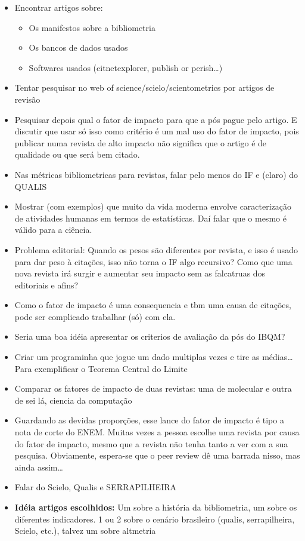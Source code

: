 \documentclass[11pt]{article}
\begin{document}
\begin{itemize}
\item Encontrar artigos sobre:
\begin{itemize}
\item Os manifestos sobre a bibliometria
\item Os bancos de dados usados
\item Softwares usados (citnetexplorer, publish or perish\ldots{})
\end{itemize}
\item Tentar pesquisar no web of science/scielo/scientometrics por artigos de revisão
\item Pesquisar depois qual o fator de impacto para que a pós pague pelo artigo. E discutir que usar só isso como critério é um mal uso do fator de impacto, pois publicar numa revista de alto impacto não significa que o artigo é de qualidade ou que será bem citado.
\item Nas métricas bibliometricas para revistas, falar pelo menos do IF e (claro) do QUALIS
\item Mostrar (com exemplos) que muito da vida moderna envolve caracterização de atividades humanas em termos de estatísticas. Daí falar que o mesmo é válido para a ciência.
\item Problema editorial: Quando os pesos são diferentes por revista, e isso é usado para dar peso à citações, isso não torna o IF algo recursivo? Como que uma nova revista irá surgir e aumentar seu impacto sem as falcatruas dos editoriais e afins?
\item Como o fator de impacto é uma consequencia e tbm uma causa de citações, pode ser complicado trabalhar (só) com ela.
\item Seria uma boa idéia apresentar os criterios de avaliação da pós do IBQM?
\item Criar um programinha que jogue um dado multiplas vezes e tire as médias\ldots{} Para exemplificar o Teorema Central do Limite
\item Comparar os fatores de impacto de duas revistas: uma de molecular e outra de sei lá, ciencia da computação
\item Guardando as devidas proporções, esse lance do fator de impacto é tipo a nota de corte do ENEM. Muitas vezes a pessoa escolhe uma revista por causa do fator de impacto, mesmo que a revista não tenha tanto a ver com a sua pesquisa. Obviamente, espera-se que o peer review dê uma barrada nisso, mas ainda assim\ldots{}
\item Falar do Scielo, Qualis e SERRAPILHEIRA
\item \textbf{Idéia artigos escolhidos:} Um sobre a história da bibliometria, um sobre os diferentes indicadores. 1 ou 2 sobre o cenário brasileiro (qualis, serrapilheira, Scielo, etc.), talvez um sobre altmetria

\end{itemize}
\end{document}
